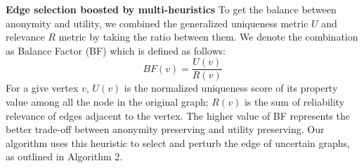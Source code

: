 
\textbf{Edge selection boosted by multi-heuristics}
To get the balance between anonymity and utility, we combined the generalized uniqueness metric $U$ and relevance $R$ metric by taking the ratio between them. 
We denote the combination as Balance Factor (BF) which is defined as follows:
\begin{equation*}
    BF(v)=\frac{U(v)}{R(v)}
\end{equation*}
For a give vertex $v$, $U(v)$ is the normalized uniqueness score of its property value among all the node in the original graph; $R(v)$ is the sum of reliability relevance of edges adjacent to the vertex. 
The higher value of BF represents the better trade-off between anonymity preserving and utility preserving. 
Our algorithm uses this heuristic to select and perturb the edge of uncertain graphs, as outlined in Algorithm 2. 




